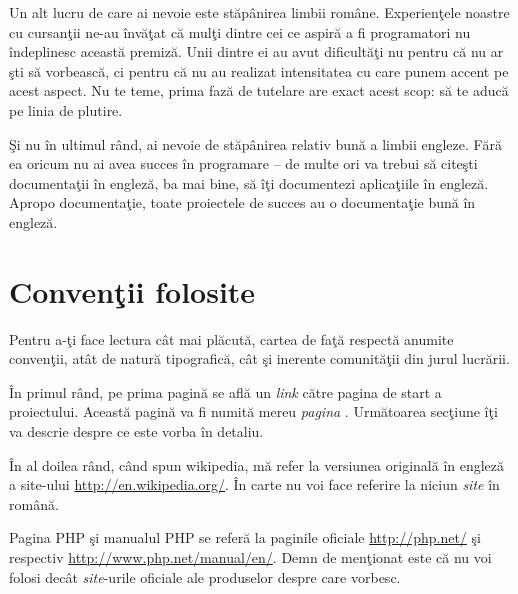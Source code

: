
Un alt lucru de care ai nevoie este stăpânirea limbii române. Experienţele
noastre cu cursanţii ne-au învăţat că mulţi dintre cei ce aspiră a fi
programatori nu îndeplinesc această premiză. Unii dintre ei au avut dificultăţi
nu pentru că nu ar şti să vorbească, ci pentru că nu au realizat intensitatea
cu care punem accent pe acest aspect. Nu te teme, prima fază
de tutelare are exact acest scop: să te aducă pe linia de plutire.

Şi nu în ultimul rând, ai nevoie de stăpânirea relativ bună a limbii engleze.
Fără ea oricum nu ai avea succes în programare -- de multe ori va trebui
să citeşti documentaţii în engleză, ba mai bine, să îţi documentezi aplicaţiile
în engleză. Apropo documentaţie, toate proiectele de succes au o documentaţie
bună în engleză.

{}
\section*{Convenţii folosite}
Pentru a-ţi face lectura cât mai plăcută, cartea de faţă respectă anumite
convenţii, atât de natură tipografică, cât şi inerente comunităţii din jurul
lucrării.

În primul rând, pe prima pagină se află un \textsl{link} către pagina de
start a proiectului. Această pagină va fi numită mereu \textit{pagina \phpro}.
Următoarea secţiune îţi va descrie despre ce este vorba în detaliu.

În al doilea rând, când spun wikipedia, mă refer la versiunea originală
în engleză a site-ului \url{http://en.wikipedia.org/}. În carte nu voi face referire
la niciun \textsl{site} în română.


{\glqq}Pagina PHP{\grqq} şi {\glqq}manualul PHP{\grqq} se referă la paginile oficiale \url{http://php.net/}
şi respectiv \url{http://www.php.net/manual/en/}. Demn de menţionat este
că nu voi folosi decât \textit{site}-urile oficiale ale produselor despre
care vorbesc.

